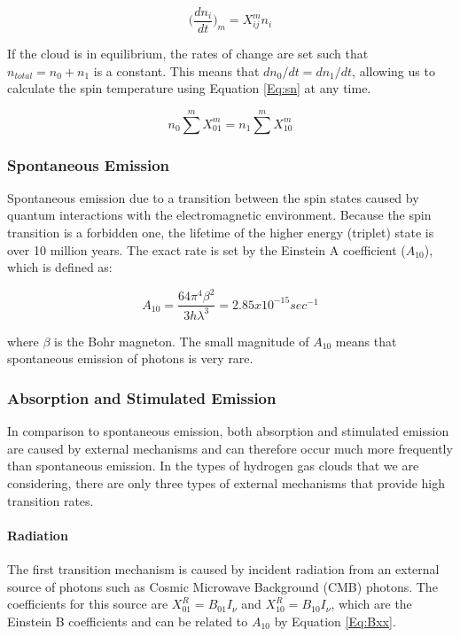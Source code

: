 \begin{equation} \label{Eq:dn}
\Big( \frac{d n_i}{dt} \Big)_m = X^m_{ij} n_i
\end{equation}

If the cloud is in equilibrium, the rates of change are set such that $n_{total} = n_0 + n_1$ is a constant. This means that $d n_0/dt = d n_1 /dt$, allowing us to calculate the spin temperature using Equation \ref{Eq:sn} at any time.

\begin{equation} \label{Eq:sn}
n_0 \sum^m X^m_{01} = n_1 \sum^m X^m_{10}
\end{equation}

\subsubsection{Spontaneous Emission}
Spontaneous emission due to a transition between the spin states caused by quantum interactions with the electromagnetic environment. Because the spin transition is a forbidden one, the lifetime of the higher energy (triplet) state is over 10 million years. The exact rate is set by the Einstein A coefficient ($A_{10}$), which is defined as: 

\begin{equation}
A_{10} = \frac{64 \pi^4 \beta^2}{3 h \lambda^3} = 2.85 x 10^{-15} sec^{-1}
\end{equation}

where $\beta$ is the Bohr magneton. The small magnitude of $A_{10}$ means that spontaneous emission of \cm photons is very rare. 

\subsubsection{Absorption and Stimulated Emission}
In comparison to spontaneous emission, both absorption and stimulated emission are caused by external mechanisms and can therefore occur much more frequently than spontaneous emission. In the types of hydrogen gas clouds that we are considering, there are only three types of external mechanisms that provide high transition rates. 

\paragraph{Radiation}
The first transition mechanism is caused by incident radiation from an external source of \cm photons such as Cosmic Microwave Background (CMB) photons. The coefficients for this source are $X^R_{01} = B_{01} I_\nu$ and $X^R_{10} = B_{10} I_\nu $, which are the Einstein B coefficients and can be related to $A_{10}$ by Equation \ref{Eq:Bxx}. 

